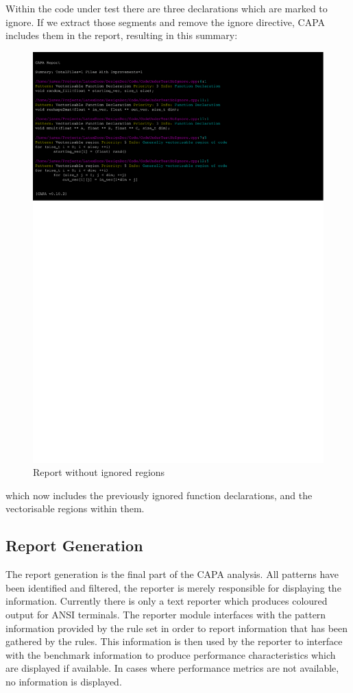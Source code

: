 Within the code under test there are three declarations which are marked to ignore. If we extract
those segments and remove the ignore directive, CAPA includes them in the report, resulting in this
summary:
\begin{figure}[H]
\includegraphics[clip,trim=0cm 19cm 4cm 0.5cm,width=\textwidth]{./Misc/removedIgnore.pdf}
\caption{Report without ignored regions}
\end{figure}
which now includes the previously ignored function declarations, and the vectorisable regions within
them.

\subsection{Report Generation}
The report generation is the final part of the CAPA analysis. All patterns have been identified and
filtered, the reporter is merely responsible for displaying the information. Currently there is only
a text reporter which produces coloured output for ANSI terminals. The reporter module interfaces
with the pattern information provided by the rule set in order to report information that has been
gathered by the rules. This information is then used by the reporter to interface with the benchmark
information to produce performance characteristics which are displayed if available. In cases where
performance metrics are not available, no information is displayed.



